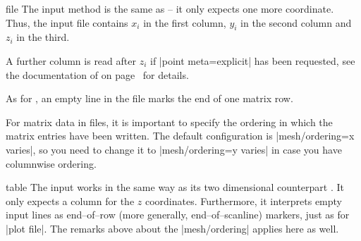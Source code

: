 \begin{addplot3operation}[]{file}{}
	The  input method is the same as  -- it only expects one more coordinate.
	Thus, the input file contains $x_i$ in the first column, $y_i$ in the second column and $z_i$ in the third. 
	
	A further column is read after $z_i$ if |point meta=explicit| has been requested, see the documentation of  on page~\pageref{pgfplots:addplot:file} for details.
	
	As for , an empty line in the file marks the end of one matrix row.
\begin{codeexample}[]
\end{codeexample}

	For matrix data in files, it is important to specify the ordering in which the matrix entries have been written. The default configuration is |mesh/ordering=x varies|, so you need to change it to |mesh/ordering=y varies| in case you have columnwise ordering.
\end{addplot3operation}

\begin{addplot3operation}[]{table}{}
	The  input works in the same way as its two dimensional counterpart . It only expects a column for the $z$ coordinates. Furthermore, it interprets empty input lines as end--of--row (more generally, end--of--scanline) markers, just as for |plot file|. The remarks above about the |mesh/ordering| applies here as well.
\end{addplot3operation}

